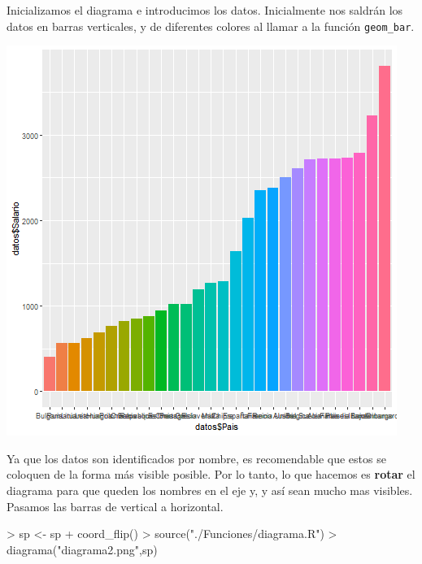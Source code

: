 \documentclass [a4paper] {article}
\begin{document}
\bigskip
Inicializamos el diagrama e introducimos los datos. Inicialmente nos saldrán los datos en barras verticales, y
de diferentes colores al llamar a la función \texttt{geom\_bar}.
\begin{Schunk}
\end{Schunk}

\includegraphics[width=\textwidth]{diagrama1}

\bigskip
Ya que los datos son identificados por nombre, es recomendable que estos se coloquen de la forma más visible
posible. Por lo tanto, lo que hacemos es \textbf{rotar} el diagrama para que queden los nombres en el eje y, y así
sean mucho mas visibles. Pasamos las barras de vertical a horizontal.
\begin{Schunk}
\begin{Sinput}
> sp <- sp + coord_flip()
> source("./Funciones/diagrama.R")
> diagrama("diagrama2.png",sp)
\end{Sinput}
\end{Schunk}
\end{document}
